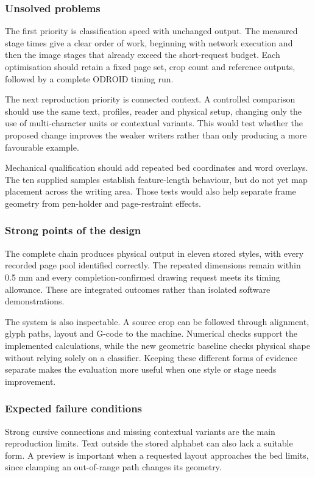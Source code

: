 \subsubsection{Unsolved problems}
\label{sec:dis-unsolved}
The first priority is classification speed with unchanged output. The measured stage times give a clear order of work, beginning with network execution and then the image stages that already exceed the short-request budget. Each optimisation should retain a fixed page set, crop count and reference outputs, followed by a complete ODROID timing run.

The next reproduction priority is connected context. A controlled comparison should use the same text, profiles, reader and physical setup, changing only the use of multi-character units or contextual variants. This would test whether the proposed change improves the weaker writers rather than only producing a more favourable example.

Mechanical qualification should add repeated bed coordinates and word overlays. The ten supplied samples establish feature-length behaviour, but do not yet map placement across the writing area. Those tests would also help separate frame geometry from pen-holder and page-restraint effects.

\subsubsection{Strong points of the design}
\label{sec:dis-strengths}
The complete chain produces physical output in eleven stored styles, with every recorded page pool identified correctly. The repeated dimensions remain within 0.5 mm and every completion-confirmed drawing request meets its timing allowance. These are integrated outcomes rather than isolated software demonstrations.

The system is also inspectable. A source crop can be followed through alignment, glyph paths, layout and G-code to the machine. Numerical checks support the implemented calculations, while the new geometric baseline checks physical shape without relying solely on a classifier. Keeping these different forms of evidence separate makes the evaluation more useful when one style or stage needs improvement.

\subsubsection{Expected failure conditions}
\label{sec:dis-failures}
Strong cursive connections and missing contextual variants are the main reproduction limits. Text outside the stored alphabet can also lack a suitable form. A preview is important when a requested layout approaches the bed limits, since clamping an out-of-range path changes its geometry.


